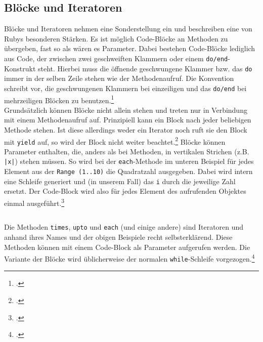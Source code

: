 \documentclass[a4paper, 11pt]{scrreprt}
\begin{document}
\subsection{Blöcke und Iteratoren}
Blöcke und Iteratoren nehmen eine Sonderstellung ein und beschreiben eine von Rubys besonderen Stärken. Es ist möglich Code-Blöcke an Methoden zu übergeben, fast so als wären es Parameter. Dabei bestehen Code-Blöcke lediglich aus Code, der zwischen zwei geschweiften Klammern oder einem \texttt{do/end}-Konstrukt steht. Hierbei muss die öffnende geschwungene Klammer bzw. das \texttt{do} immer in der selben Zeile stehen wie der Methodenaufruf. Die Konvention schreibt vor, die geschwungenen Klammern bei einzeiligen und das \texttt{do/end} bei mehrzeiligen Blöcken zu benutzen.\footcite[vgl.][S.24]{p_ruby}\\
Grundsätzlich können Blöcke nicht allein stehen und treten nur in Verbindung mit einem Methodenaufruf auf. Prinzipiell kann ein Block nach jeder beliebigen Methode stehen. Ist diese allerdings weder ein Iterator noch ruft sie den Block mit \texttt{yield} auf, so wird der Block nicht weiter beachtet.\footcite[vgl.][S.141]{ruby_lang}
Blöcke können Parameter enthalten, die, anders als bei Methoden, in vertikalen Strichen (z.B. \texttt{|x|}) stehen müssen. So wird bei der \texttt{each}-Methode im unteren Beispiel für jedes Element aus der \texttt{Range (1..10)} die Quadratzahl ausgegeben. Dabei wird intern eine Schleife generiert und (in unserem Fall) das \texttt{i} durch die jeweilige Zahl ersetzt. Der Code-Block wird also für jedes Element des aufrufenden Objektes einmal ausgeführt.\footcite[vgl.][S.56]{p_ruby}
\inputminted[]{ruby}{iterators.rb}
Die Methoden \texttt{times}, \texttt{upto} und \texttt{each} (und einige andere) sind Iteratoren und anhand ihres Names und der obigen Beispiele recht selbsterklärend. Diese Methoden können mit einem Code-Block als Parameter aufgerufen werden. Die Variante der Blöcke wird üblicherweise der normalen \texttt{while}-Schleife vorgezogen.\footcite[vgl.][S.3-4 und S.130]{ruby_lang}
\end{document}
